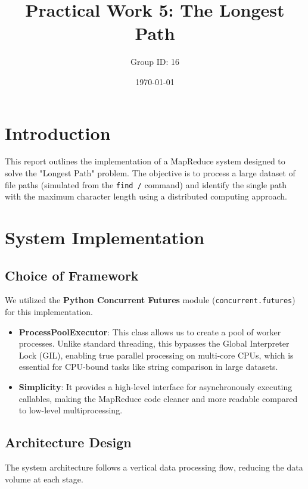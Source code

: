 \documentclass[a4paper,11pt]{article}
\title{\textbf{Practical Work 5: The Longest Path}}
\author{Group ID: 16}
\date{\today}
\begin{document}
\maketitle

\section{Introduction}
This report outlines the implementation of a MapReduce system designed to solve the "Longest Path" problem. The objective is to process a large dataset of file paths (simulated from the \texttt{find /} command) and identify the single path with the maximum character length using a distributed computing approach.

\section{System Implementation}

\subsection{Choice of Framework}
We utilized the \textbf{Python Concurrent Futures} module (\texttt{concurrent.futures}) for this implementation.
\begin{itemize}
    \item \textbf{ProcessPoolExecutor}: This class allows us to create a pool of worker processes. Unlike standard threading, this bypasses the Global Interpreter Lock (GIL), enabling true parallel processing on multi-core CPUs, which is essential for CPU-bound tasks like string comparison in large datasets.
    \item \textbf{Simplicity}: It provides a high-level interface for asynchronously executing callables, making the MapReduce code cleaner and more readable compared to low-level multiprocessing.
\end{itemize}

\subsection{Architecture Design}
The system architecture follows a vertical data processing flow, reducing the data volume at each stage.
\end{document}
